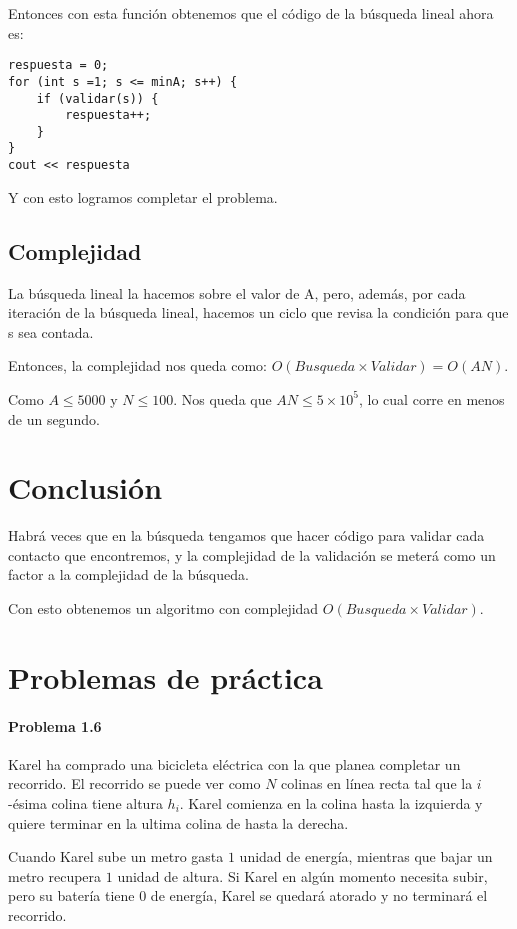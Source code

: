 Entonces con esta función obtenemos que el código de la búsqueda lineal ahora es:
\begin{lstlisting}
respuesta = 0;
for (int s =1; s <= minA; s++) {
	if (validar(s)) {
		respuesta++;
	}
}
cout << respuesta

\end{lstlisting}

Y con esto logramos completar el problema.

\subsection*{Complejidad}
La búsqueda lineal la hacemos sobre el valor de A, pero, además, por cada iteración de la búsqueda lineal, hacemos un ciclo que revisa la condición para que s sea contada.

Entonces, la complejidad nos queda como:   \(O(Busqueda\times Validar)=O(AN)\).

Como \(A\leq 5000\) y \(N\leq 100\). Nos queda que \(AN\leq 5\times 10^5\), lo cual corre en menos de un segundo.

\section*{Conclusión}
Habrá veces que en la búsqueda tengamos que hacer código para validar cada contacto que encontremos, y la complejidad de la validación se meterá como un factor a la complejidad de la búsqueda.  

Con esto obtenemos un algoritmo con complejidad \(O(Busqueda\times Validar)\).
\newpage
\section*{Problemas de práctica}

\label{bicicleta}
\paragraph{Problema 1.6}  Karel ha comprado una bicicleta eléctrica con la que planea completar un recorrido. El recorrido se puede ver como \(N\) colinas en línea recta tal que la \(i\)-ésima colina tiene altura \(h_i\). Karel comienza en la colina hasta la izquierda y quiere terminar en la ultima colina de hasta la derecha.

Cuando Karel sube un metro gasta \(1\) unidad de energía, mientras que bajar un metro recupera \(1\) unidad de altura. Si Karel en algún momento necesita subir, pero su batería tiene 0 de energía, Karel se quedará atorado y no terminará el recorrido.

